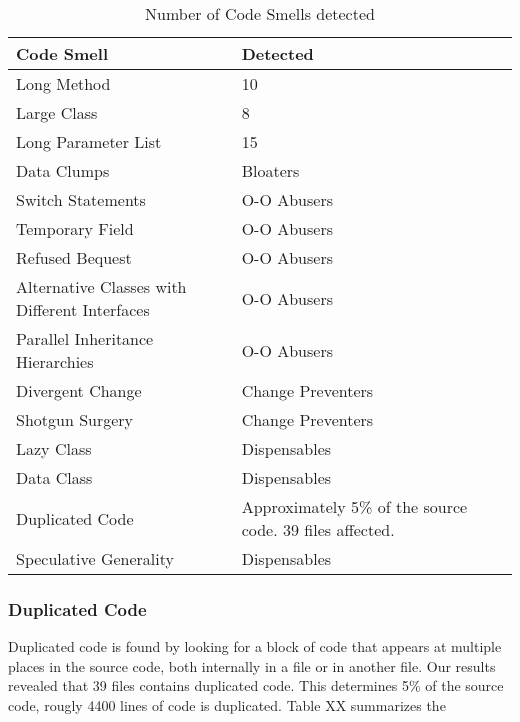 \begin{table}[]
\centering
\caption{Number of Code Smells detected}
\label{tab:identifiedCodeSmell}
\begin{tabular}{|l|l|}
\hline
\textbf{Code Smell}                           & \textbf{Detected}    \\ \hline
Long Method                                   & 10          \\ \hline
Large Class                                   & 8          \\ \hline
Long Parameter List                           & 15          \\ \hline
Data Clumps                                   & Bloaters          \\ \hline
Switch Statements                             & O-O Abusers       \\ \hline
Temporary Field                               & O-O Abusers       \\ \hline
Refused Bequest                               & O-O Abusers       \\ \hline
Alternative Classes with Different Interfaces & O-O Abusers       \\ \hline
Parallel Inheritance Hierarchies              & O-O Abusers       \\ \hline
Divergent Change                              & Change Preventers \\ \hline
Shotgun Surgery                               & Change Preventers \\ \hline
Lazy Class                                    & Dispensables      \\ \hline
Data Class                                    & Dispensables      \\ \hline
Duplicated Code                               & Approximately 5\% of the source code. 39 files affected.       \\ \hline
Speculative Generality                        & Dispensables      \\ \hline
\end{tabular}
\end{table}

\subsubsection{Duplicated Code}
Duplicated code is found by looking for a block of code that appears at multiple places in the source code, both internally in a file or in another file. Our results revealed that 39 files contains duplicated code. This determines 5\% of the source code, rougly 4400 lines of code is duplicated. Table XX summarizes the

